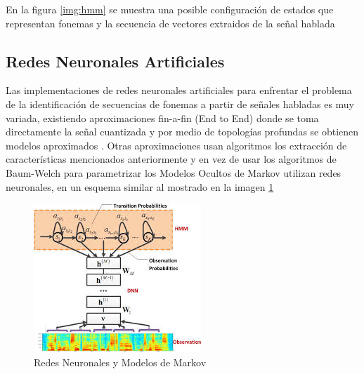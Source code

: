 En la figura \ref{img:hmm} se muestra una posible configuración de estados que representan fonemas y la secuencia de vectores extraidos de la señal hablada

\subsection{Redes Neuronales Artificiales}

Las implementaciones de redes neuronales artificiales para enfrentar el problema de la identificación de secuencias de fonemas a partir de señales habladas es muy variada, existiendo aproximaciones fin-a-fin (End to End) donde se toma directamente la señal cuantizada y por medio de topologías profundas se obtienen modelos aproximados \cite{Hannun2014}. Otras aproximaciones usan algoritmos los extracción de características mencionados anteriormente y en vez de usar los algoritmos de Baum-Welch para parametrizar los Modelos Ocultos de Markov utilizan redes neuronales, en un esquema similar al mostrado en la imagen \ref{img:cd-dnn-hmm}

\begin{figure}[H]

\centering
\caption{Redes Neuronales y Modelos de Markov \cite{Deng2012}}
\label{img:cd-dnn-hmm}
\includegraphics[]{images/cd-dnn-hmm.jpeg}
\end{figure}


